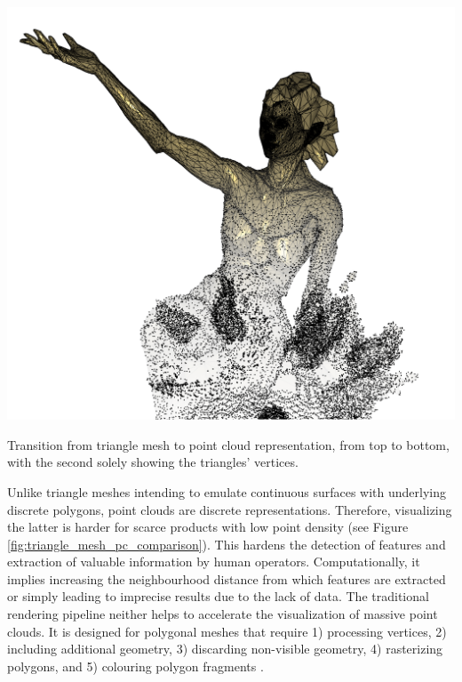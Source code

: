 \begin{marginfigure}[3.0cm]
	\includegraphics{figs/fundamentals/triangle_mesh_point_cloud.png}
	\caption{Transition from triangle mesh to point cloud representation, from top to bottom, with the second solely showing the triangles' vertices.}
	\label{fig:triangle_mesh_pc_comparison}
\end{marginfigure}
Unlike triangle meshes intending to emulate continuous surfaces with underlying discrete polygons, point clouds are discrete representations. Therefore, visualizing the latter is harder for scarce products with low point density (see Figure \ref{fig:triangle_mesh_pc_comparison}). This hardens the detection of features and extraction of valuable information by human operators. Computationally, it implies increasing the neighbourhood distance from which features are extracted or simply leading to imprecise results due to the lack of data. The traditional rendering pipeline neither helps to accelerate the visualization of massive point clouds. It is designed for polygonal meshes that require 1) processing vertices, 2) including additional geometry, 3) discarding non-visible geometry, 4) rasterizing polygons, and 5) colouring polygon fragments \cite{akenine-moller_real-time_2018}.

